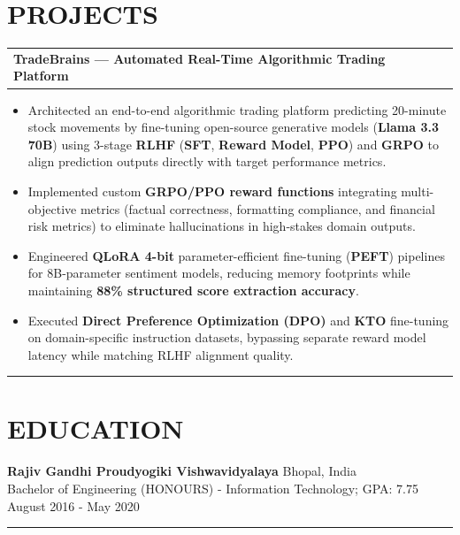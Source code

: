\documentclass[100pt,a4paper]{article}
\newcommand{\sectionline}{
\begin{center}
\vspace{-10pt}
\rule{1\textwidth}{0.5pt}
\end{center}
\vspace{1pt}
}
\begin{document}
\section*{PROJECTS}
\begin{tabularx}{\textwidth}{@{} X >{\raggedleft\arraybackslash}p{8cm} @{}}
\textbf{TradeBrains — Automated Real-Time Algorithmic Trading Platform}
\end{tabularx}
\begin{itemize}
\vspace{4pt}
\item {Architected an end-to-end algorithmic trading platform predicting 20-minute stock movements by fine-tuning open-source generative models (\textbf{Llama 3.3 70B}) using 3-stage \textbf{RLHF} (\textbf{SFT}, \textbf{Reward Model}, \textbf{PPO}) and \textbf{GRPO} to align prediction outputs directly with target performance metrics.}
\item {Implemented custom \textbf{GRPO/PPO reward functions} integrating multi-objective metrics (factual correctness, formatting compliance, and financial risk metrics) to eliminate hallucinations in high-stakes domain outputs.}
\item {Engineered \textbf{QLoRA 4-bit} parameter-efficient fine-tuning (\textbf{PEFT}) pipelines for 8B-parameter sentiment models, reducing memory footprints while maintaining \textbf{88\% structured score extraction accuracy}.}
\item {Executed \textbf{Direct Preference Optimization (DPO)} and \textbf{KTO} fine-tuning on domain-specific instruction datasets, bypassing separate reward model latency while matching RLHF alignment quality.}
\end{itemize}

\sectionline
\section*{EDUCATION}
\textbf{Rajiv Gandhi Proudyogiki Vishwavidyalaya} \hfill Bhopal, India \\[2pt]
Bachelor of Engineering (HONOURS) - Information Technology; GPA: 7.75 
\hfill August 2016 - May 2020

\sectionline
\end{document}
